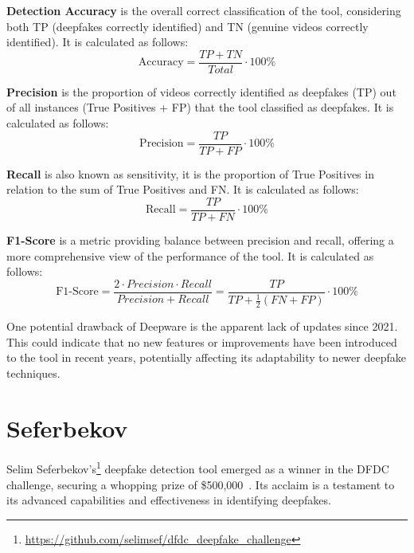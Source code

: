 \textbf{Detection Accuracy} is the overall correct classification of the tool,
considering both \ac{TP} (deepfakes correctly identified) and \ac{TN}
(genuine videos correctly identified). It is calculated as follows:
\begin{equation}
	{\text{Accuracy}} = \frac{TP + TN}{\textit{Total}} \cdot \textit{100\%}\label{eq:accuracy}
\end{equation}

\textbf{Precision} is the proportion of videos correctly identified as deepfakes
(\ac{TP}) out of all instances (True Positives + \ac{FP}) that the tool classified as deepfakes. It is calculated
as follows:
\begin{equation}
	{\text{Precision}} = \frac{TP}{TP + FP} \cdot \textit{100\%}\label{eq:precision}
\end{equation}

\textbf{Recall} is also known as sensitivity, it is the proportion of True Positives
in relation to the sum of True Positives and \ac{FN}. It is calculated as follows:
\begin{equation}
	{\text{Recall}} = \frac{TP}{TP + FN} \cdot \textit{100\%}\label{eq:recall}
\end{equation}

\textbf{F1-Score} is a metric providing balance between precision and recall, offering
a more comprehensive view of the performance of the tool. It is calculated as follows:
\begin{equation}
	{\text{F1-Score}} = \frac{2 \cdot Precision \cdot Recall}{Precision + Recall}
	= \frac{TP}{TP + \frac{1}{2}(FN + FP)} \cdot \textit{100\%}\label{eq:f1-score}
\end{equation}


One potential drawback of Deepware is the apparent lack of updates since 2021.
This could indicate that no new features or improvements have been introduced
to the tool in recent years, potentially affecting its adaptability to newer
deepfake techniques.


\section{Seferbekov}
Selim Seferbekov's\footnote{\url{https://github.com/selimsef/dfdc_deepfake_challenge}}
deepfake detection tool emerged as a winner in the \ac{DFDC}
challenge, securing a whopping prize of \$500,000~\cite{kaggle2020}. Its acclaim is a testament
to its advanced capabilities and effectiveness in identifying deepfakes.

